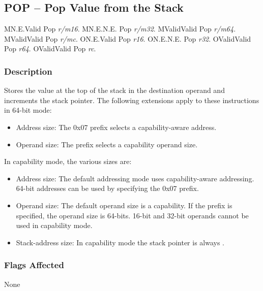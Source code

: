\clearpage
{}
{}
\subsection*{POP -- Pop Value from the Stack}

\begin{x86opcodetable}
  {M}{N.E.}{Valid}
  {Pop \emph{r/m16}.}
  {M}{N.E.}{N.E.}
  {Pop \emph{r/m32}.}
  {M}{Valid}{Valid}
  {Pop \emph{r/m64}.}
  {M}{Valid}{Valid}
  {Pop \emph{r/mc}.}
  {O}{N.E.}{Valid}
  {Pop \emph{r16}.}
  {O}{N.E.}{N.E.}
  {Pop \emph{r32}.}
  {O}{Valid}{Valid}
  {Pop \emph{r64}.}
  {O}{Valid}{Valid}
  {Pop \emph{rc}.}
\end{x86opcodetable}

\begin{x86opentable}
\end{x86opentable}

\subsubsection*{Description}

Stores the value at the top of the stack in the destination operand
and increments the stack pointer.  The following extensions apply to
these instructions in 64-bit mode:

\begin{itemize}
  \item Address size: The 0x07 prefix selects a capability-aware
    address.

  \item Operand size: The  prefix selects a capability
    operand size.
\end{itemize}

In capability mode, the various sizes are:

\begin{itemize}
  \item Address size: The default addressing mode uses
    capability-aware addressing.  64-bit addresses can be used by
    specifying the 0x07 prefix.

  \item Operand size: The default operand size is a capability.  If
    the  prefix is specified, the operand size is
    64-bits.  16-bit and 32-bit operands cannot be used in capability
    mode.

  \item Stack-address size: In capability mode the stack pointer is
    always \CSP{}.
\end{itemize}

\subsubsection*{Flags Affected}

None
